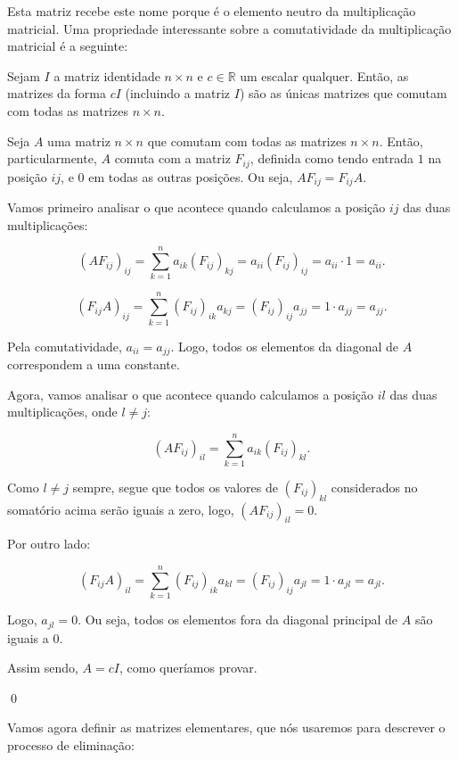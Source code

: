 Esta matriz recebe este nome porque é o elemento neutro da multiplicação matricial. Uma propriedade interessante sobre a comutatividade da multiplicação matricial é a seguinte:

\begin{Theorem}
	Sejam $I$ a matriz identidade $n\times n$ e $c\in\mathbb{R}$ um escalar qualquer. Então, as matrizes da forma $cI$ (incluindo a matriz $I$) são as únicas matrizes que comutam com todas as matrizes $n\times n$.
\end{Theorem}

\begin{Proof}
	Seja $A$ uma matriz $n\times n$ que comutam com todas as matrizes $n\times n$. Então, particularmente, $A$ comuta com a matriz $F_{ij}$, definida como tendo entrada $1$ na posição $ij$, e $0$ em todas as outras posições. Ou seja, $AF_{ij} = F_{ij}A$.
	
	Vamos primeiro analisar o que acontece quando calculamos a posição $ij$ das duas multiplicações:
	
	$$
	(AF_{ij})_{ij} = \sum\limits_{k = 1}^{n} a_{ik}(F_{ij})_{kj} = a_{ii}(F_{ij})_{ij} = a_{ii}\cdot 1 = a_{ii}.
	$$
	
	$$
	(F_{ij}A)_{ij} = \sum\limits_{k = 1}^{n} (F_{ij})_{ik}a_{kj} = (F_{ij})_{ij}a_{jj} = 1\cdot a_{jj} = a_{jj}.
	$$
	
	Pela comutatividade, $a_{ii} = a_{jj}$. Logo, todos os elementos da diagonal de $A$ correspondem a uma constante.
	
	Agora, vamos analisar o que acontece quando calculamos a posição $il$ das duas multiplicações, onde $l\neq j$:
	
	$$
	(AF_{ij})_{il} = \sum\limits_{k = 1}^{n} a_{ik}(F_{ij})_{kl}.
	$$
	
	Como $l\neq j$ sempre, segue que todos os valores de $(F_{ij})_{kl}$ considerados no somatório acima serão iguais a zero, logo, $(AF_{ij})_{il} = 0$.
	
	Por outro lado:
	
	$$
	(F_{ij}A)_{il} = \sum\limits_{k = 1}^n	(F_{ij})_{ik}a_{kl} = (F_{ij})_{ij}a_{jl} = 1\cdot a_{jl} = a_{jl}.
	$$
	
	Logo, $a_{jl} = 0$. Ou seja, todos os elementos fora da diagonal principal de $A$ são iguais a $0$.
	
	Assim sendo, $A = cI$, como queríamos provar.
	
	\qed
\end{Proof}

Vamos agora definir as matrizes elementares, que nós usaremos para descrever o processo de eliminação:

